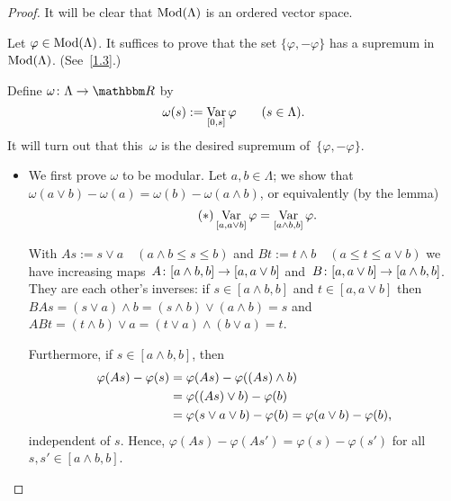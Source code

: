 \documentclass[main.tex]{subfiles}
\begin{document}
\begin{proof}
It will be clear that $\mathrm{Mod}(\Lambda)$ is an ordered vector space.

Let $\varphi\in\mathrm{Mod}(\Lambda)$. 
It suffices to prove that the set $\{\varphi,-\varphi\}$
has a supremum in~$\mathrm{Mod}(\Lambda)$. (See~\ref{1.3}.)

Define $\omega\colon\Lambda \ra \R$ by
\begin{equation*}
\omega(s) := \mathop{\mathrm{Var}}_{[0,s]}\varphi \qquad (s\in \Lambda)\text{.}
\end{equation*}
It will turn out that this~$\omega$ 
is the desired supremum of~$\{\varphi,-\varphi\}$.
\begin{itemize}
\item 
We first prove $\omega$ to be modular.
Let $a,b\in \Lambda$; we show that
$\omega(a\vee b) - \omega(a) = \omega(b) - \omega(a\wedge b)$,
or equivalently (by the lemma)
\begin{equation}
\label{eq1.10_1}  \tag{$*$}
\mathop{\mathrm{Var}}_{[a,a\vee b]}\varphi = \mathop{\mathrm{Var}}_{[a\wedge b,b]}\varphi 
\text{.}
\end{equation}

With $As := s\vee a \quad (a\wedge b\leq s\leq b)$
and $Bt := t\wedge b \quad (a\leq t \leq a\vee b)$
we have increasing maps~$A\colon [a\wedge b,b]\rightarrow [a,a\vee b]$
and~$B\colon [a,a\vee b]\rightarrow[a\wedge b,b]$.
They are each other's inverses: 
if $s\in[a\wedge b, b]$ and $t\in [a,a\vee b]$
then~$BAs = (s\vee a)\wedge b = (s\wedge b) \vee (a\wedge b) = s$ 
and~$ABt = (t\wedge b)\vee a = (t\vee a)\wedge(b\vee a) = t$.

Furthermore, if $s\in [a\wedge b, b]$, then
\begin{align*}
\varphi(As) - \varphi(s) 
  & = \varphi(As) - \varphi ((As)\wedge b) \\
  & = \varphi((As)\vee b) - \varphi(b) \\
  & = \varphi(s\vee a\vee b)-\varphi(b) = \varphi(a\vee b)-\varphi(b)
\text{,}
\end{align*}
independent of $s$.
Hence, $\varphi(As)-\varphi(As')=\varphi(s)-\varphi(s')$
for all $s,s'\in[a\wedge b,b]$.


\end{itemize}
\end{proof}
\end{document}
